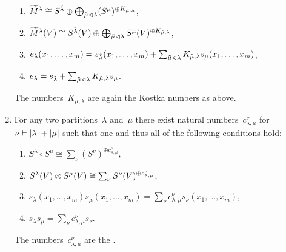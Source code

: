 \documentclass[a4paper,10pt]{scrartcl}
\begin{document}
\begin{example}
\begin{enumerate}
\begin{enumerate}
        \item
          $\widetilde{M}^\lambda \cong S^{\tilde{\lambda}} \oplus \bigoplus_{\tilde{\mu} \vartriangleleft \lambda} (S^\mu)^{\oplus K_{\tilde{\mu}, \lambda}}$,
        \item
          $\widetilde{M}^\lambda(V) \cong S^{\tilde{\lambda}}(V) \oplus \bigoplus_{\tilde{\mu} \vartriangleleft \lambda} S^\mu(V)^{\oplus K_{\tilde{\mu}, \lambda}}$,
        \item
          $e_\lambda(x_1, \dotsc, x_m) = s_{\tilde{\lambda}}(x_1, \dotsc, x_m) + \sum_{\tilde{\mu} \vartriangleleft \lambda} K_{\tilde{\mu}, \lambda} s_\mu(x_1, \dotsc, x_m)$,
        \item
          $e_\lambda = s_{\tilde{\lambda}} + \sum_{\tilde{\mu} \vartriangleleft \lambda} K_{\tilde{\mu}, \lambda} s_\mu$.
      \end{enumerate}
      The numbers~$K_{\mu, \lambda}$ are again the Kostka numbers as above.
    \item
      For any two partitions~$\lambda$ and~$\mu$ there exist natural numbers~$c^{\nu}_{\lambda, \mu}$ for~$\nu \vdash \lvert\lambda\rvert + \lvert\mu\rvert$ such that one and thus all of the following conditions hold:
      \begin{enumerate}
        \item
          $S^\lambda \circ S^\mu \cong \sum_\nu (S^\nu)^{\oplus c_{\lambda, \mu}^{\nu}}$,
        \item
          $S^\lambda(V) \otimes S^\mu(V) \cong \sum_\nu S^\nu(V)^{\oplus c_{\lambda, \mu}^{\nu}}$,
        \item
          $s_\lambda(x_1, \dotsc, x_m) s_\mu(x_1, \dotsc, x_m) = \sum_{\nu} c_{\lambda, \mu}^\nu s_\nu(x_1, \dotsc, x_m)$,
        \item
          $s_\lambda s_\mu = \sum_{\nu} c_{\lambda, \mu}^{\nu} s_\nu$.
      \end{enumerate}
      The numbers~$c_{\lambda, \mu}^{\nu}$ are the .
  \end{enumerate}
\end{example}
\end{document}
